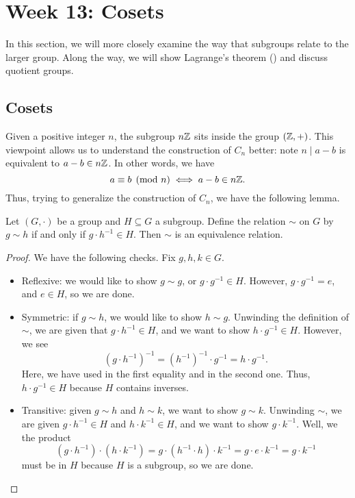 \documentclass[../main.tex]{subfiles}
\begin{document}
\section{Week 13: Cosets}
In this section, we will more closely examine the way that subgroups relate to the larger group. Along the way, we will show Lagrange's theorem () and discuss quotient groups.

\subsection{Cosets}
Given a positive integer $n$, the subgroup $n\mathbb Z$ sits inside the group $(\mathbb Z,+)$. This viewpoint allows us to understand the construction of $C_n$ better: note $n\mid a-b$ is equivalent to $a-b\in n\mathbb Z$. In other words, we have
\[a\equiv b\pmod n\iff a-b\in n\mathbb Z.\]
Thus, trying to generalize the construction of $C_n$, we have the following lemma.
\begin{lemma} \label{lem:r-coset-equiv}
    Let $(G,\cdot)$ be a group and $H\subseteq G$ a subgroup. Define the relation $\sim$ on $G$ by $g\sim h$ if and only if $g\cdot h^{-1}\in H$. Then $\sim$ is an equivalence relation.
\end{lemma}
\begin{proof}
    We have the following checks. Fix $g,h,k\in G$.
    \begin{itemize}
        \item Reflexive: we would like to show $g\sim g$, or $g\cdot g^{-1}\in H$. However, $g\cdot g^{-1}=e$, and $e\in H$, so we are done.
        \item Symmetric: if $g\sim h$, we would like to show $h\sim g$. Unwinding the definition of $\sim$, we are given that $g\cdot h^{-1}\in H$, and we want to show $h\cdot g^{-1}\in H$. However, we see
        \[\left(g\cdot h^{-1}\right)^{-1}=\left(h^{-1}\right)^{-1}\cdot g^{-1}=h\cdot g^{-1}.\]
        Here, we have used  in the first equality and  in the second one. Thus, $h\cdot g^{-1}\in H$ because $H$ contains inverses.
        \item Transitive: given $g\sim h$ and $h\sim k$, we want to show $g\sim k$. Unwinding $\sim$, we are given $g\cdot h^{-1}\in H$ and $h\cdot k^{-1}\in H$, and we want to show $g\cdot k^{-1}$. Well, we the product
        \[\left(g\cdot h^{-1}\right)\cdot\left(h\cdot k^{-1}\right)=g\cdot \left(h^{-1}\cdot h\right)\cdot k^{-1}=g\cdot e\cdot k^{-1}=g\cdot k^{-1}\]
        must be in $H$ because $H$ is a subgroup, so we are done.
        \qedhere
    \end{itemize}
\end{proof}
\end{document}
